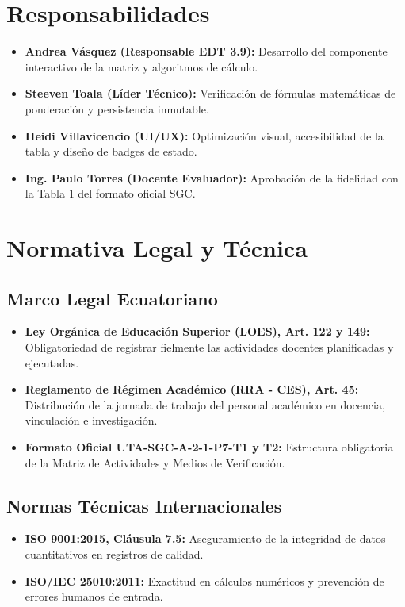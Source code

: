 \documentclass[12pt,a4paper]{article}
\begin{document}
\section{Responsabilidades}
\begin{itemize}[leftmargin=1.5em, itemsep=2pt]
    \item \textbf{Andrea Vásquez (Responsable EDT 3.9):} Desarrollo del componente interactivo de la matriz y algoritmos de cálculo.
    \item \textbf{Steeven Toala (Líder Técnico):} Verificación de fórmulas matemáticas de ponderación y persistencia inmutable.
    \item \textbf{Heidi Villavicencio (UI/UX):} Optimización visual, accesibilidad de la tabla y diseño de badges de estado.
    \item \textbf{Ing. Paulo Torres (Docente Evaluador):} Aprobación de la fidelidad con la Tabla 1 del formato oficial SGC.
\end{itemize}

\section{Normativa Legal y Técnica}
\subsection{Marco Legal Ecuatoriano}
\begin{itemize}[leftmargin=1.5em, itemsep=2pt]
    \item \textbf{Ley Orgánica de Educación Superior (LOES), Art. 122 y 149:} Obligatoriedad de registrar fielmente las actividades docentes planificadas y ejecutadas.
    \item \textbf{Reglamento de Régimen Académico (RRA - CES), Art. 45:} Distribución de la jornada de trabajo del personal académico en docencia, vinculación e investigación.
    \item \textbf{Formato Oficial UTA-SGC-A-2-1-P7-T1 y T2:} Estructura obligatoria de la Matriz de Actividades y Medios de Verificación.
\end{itemize}
\subsection{Normas Técnicas Internacionales}
\begin{itemize}[leftmargin=1.5em, itemsep=2pt]
    \item \textbf{ISO 9001:2015, Cláusula 7.5:} Aseguramiento de la integridad de datos cuantitativos en registros de calidad.
    \item \textbf{ISO/IEC 25010:2011:} Exactitud en cálculos numéricos y prevención de errores humanos de entrada.
\end{itemize}
\end{document}
